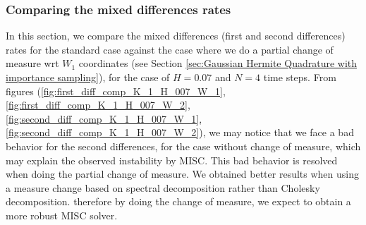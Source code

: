 \documentclass[11pt]{article}
\begin{document}
\FloatBarrier

 \subsubsection{Comparing the mixed differences rates}
 In this section, we compare the mixed differences (first and second differences) rates for the standard case against the case where we do a partial change of measure wrt $W_1$ coordinates (see Section \ref{sec:Gaussian Hermite Quadrature with importance sampling}), for the case of $H=0.07$ and  $N=4$ time steps. From figures (\ref{fig:first_diff_comp_K_1_H_007_W_1},\ref{fig:first_diff_comp_K_1_H_007_W_2},\ref{fig:second_diff_comp_K_1_H_007_W_1},\ref{fig:second_diff_comp_K_1_H_007_W_2}), we may notice that we face a bad behavior for the second differences, for the case without change of measure, which may explain the observed instability by MISC. This bad behavior is resolved when doing the partial change of measure. We obtained better results when using a measure change based on spectral decomposition rather than Cholesky decomposition. therefore by doing the change of measure, we expect to obtain a more robust MISC solver.
 
\end{document}

